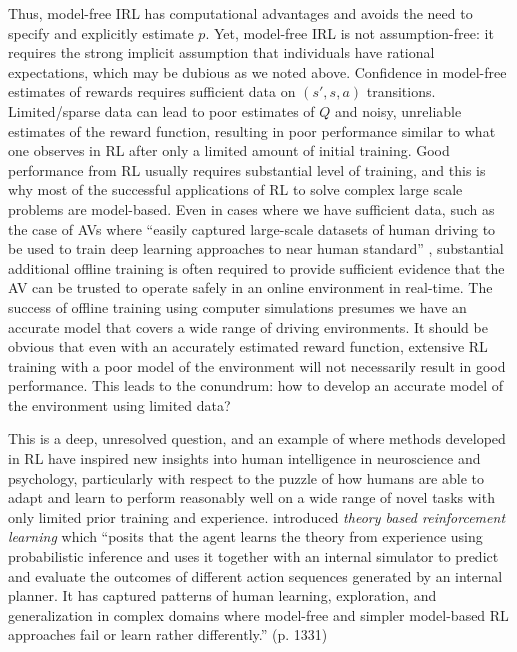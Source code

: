 Thus, model-free IRL has computational advantages and avoids the need to specify and explicitly estimate $p$. Yet,
model-free IRL is not assumption-free: it requires
the strong implicit assumption that individuals have rational expectations, which may be dubious as we noted above.
Confidence in model-free estimates of rewards requires sufficient data on $(s',s,a)$ transitions. Limited/sparse 
data can lead to poor estimates of $Q$ and noisy, unreliable estimates of the reward function, resulting in poor performance
similar to what one observes in RL after only a limited amount of initial training. Good performance from RL usually
requires substantial level of training, and this is why most of the successful applications of RL to solve complex
large scale problems are model-based. Even  in cases where we have sufficient data, such as the case of AVs
where  ``easily captured large-scale datasets of human driving to be used to train deep learning approaches to near human standard'' 
\citep{mero:2022}, substantial additional offline training is often required to provide sufficient evidence that the  AV can be trusted
to operate safely in an online environment in real-time.
The success of offline training using computer simulations presumes we have an accurate model that covers a wide range of driving environments.
It should be obvious that even with an accurately estimated reward function,
extensive RL training with a poor model of the environment will not necessarily result in good performance. This leads to the conundrum: how
to develop an accurate model of the environment using limited data? 

This is a deep, unresolved question, and an example of where methods developed in RL have inspired new insights into human intelligence
in neuroscience and psychology, particularly with respect to the puzzle of how humans are able to adapt and learn to perform reasonably well on 
a wide range of novel tasks with only limited prior training and experience. \citet{theorybasedRL:2023} introduced {\it theory based reinforcement learning\/}
which ``posits that the agent learns the theory from experience using probabilistic inference and uses it together with an internal simulator 
to predict and evaluate the outcomes of different action sequences generated by an internal planner. It has captured patterns of human learning, exploration,
 and generalization in complex domains where model-free and simpler model-based RL approaches fail or learn rather differently.'' (p. 1331)


